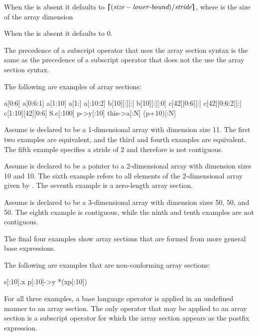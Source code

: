 \begin{ccppspecific}
When the  is absent it defaults to
$\blceil(\plc{size} - \plc{lower-bound})/\plc{stride}\brceil$, where  is
the size of the array dimension

When the  is absent it defaults to 0.

The precedence of a subscript operator that uses the array section syntax is
the same as the precedence of a subscript operator that does not the use the
array section syntax.

\begin{note}
The following are examples of array sections:

\begin{indentedcodelist}
a[0:6]
a[0:6:1]
a[1:10]
a[1:]
a[:10:2]
b[10][:][:]
b[10][:][:0]
c[42][0:6][:]
c[42][0:6:2][:]
c[1:10][42][0:6]
S.c[:100]
p->y[:10]
this->a[:N]
(p+10)[:N]
\end{indentedcodelist}

Assume  is declared to be a 1-dimensional array with dimension size
11.  The first two examples are equivalent, and the third and fourth
examples are equivalent. The fifth example specifies a stride of 2 and
therefore is not contiguous.

Assume  is declared to be a pointer to a 2-dimensional array with
dimension sizes 10 and 10. The sixth example refers to all elements of the
2-dimensional array given by . The seventh
example is a zero-length array section.

Assume  is declared to be a 3-dimensional array with dimension sizes
50, 50, and 50.  The eighth example is contiguous, while the ninth and
tenth examples are not contiguous.

The final four examples show array sections that are formed from
more general base expressions.

The following are examples that are non-conforming array sections:

\begin{indentedcodelist}
s[:10].x
p[:10]->y
*(xp[:10])
\end{indentedcodelist}

For all three examples, a base language operator is applied in an undefined
manner to an array section. The only operator that may be applied to an array
section is a subscript operator for which the array section appears as the
postfix expression.
\end{note}
\medskip
\end{ccppspecific}


